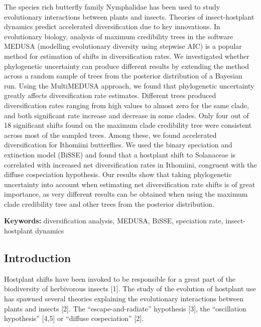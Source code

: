 \documentclass[10pt]{article}
\begin{document}
The species rich butterfly family Nymphalidae has been used to study
evolutionary interactions between plants and insects. Theories of
insect-hostplant dynamics predict accelerated diversification due to key
innovations. In evolutionary biology, analysis of maximum credibility
trees in the software MEDUSA (modelling evolutionary diversity using
stepwise AIC) is a popular method for estimation of shifts in
diversification rates. We investigated whether phylogenetic uncertainty
can produce different results by extending the method across a random
sample of trees from the posterior distribution of a Bayesian run. Using
the MultiMEDUSA approach, we found that phylogenetic uncertainty greatly
affects diversification rate estimates. Different trees produced
diversification rates ranging from high values to almost zero for the
same clade, and both significant rate increase and decrease in some
clades. Only four out of 18 significant shifts found on the maximum
clade credibility tree were consistent across most of the sampled trees.
Among these, we found accelerated diversification for Ithomiini
butterflies. We used the binary speciation and extinction model (BiSSE)
and found that a hostplant shift to Solanaceae is correlated with
increased net diversification rates in Ithomiini, congruent with the
diffuse cospeciation hypothesis. Our results show that taking
phylogenetic uncertainty into account when estimating net
diversification rate shifts is of great importance, as very different
results can be obtained when using the maximum clade credibility tree
and other trees from the posterior distribution.

\textbf{Keywords:} diversification analysis, MEDUSA, BiSSE, speciation
rate, insect-hostplant dynamics

\subsection*{Introduction}

Hostplant shifts have been invoked to be responsible for a great part of
the biodiversity of herbivorous insects {[}1{]}. The study of the
evolution of hostplant use has spawned several theories explaining the
evolutionary interactions between plants and insects {[}2{]}. The
``escape-and-radiate'' hypothesis {[}3{]}, the ``oscillation
hypothesis'' {[}4,5{]} or ``diffuse cospeciation'' {[}2{]}.
\end{document}
